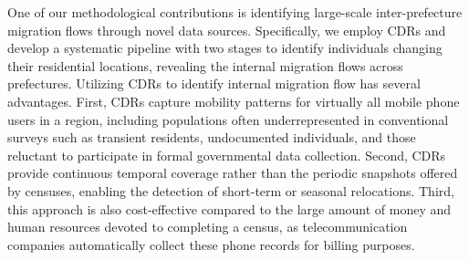 One of our methodological contributions is identifying large-scale inter-prefecture migration flows through novel data sources.
Specifically, we employ CDRs and develop a systematic pipeline with two stages to identify individuals changing their residential locations, revealing the internal migration flows across prefectures.
Utilizing CDRs to identify internal migration flow has several advantages. First, CDRs capture mobility patterns for virtually all mobile phone users in a region, including populations often underrepresented in conventional surveys such as transient residents, undocumented individuals, and those reluctant to participate in formal governmental data collection. Second, CDRs provide continuous temporal coverage rather than the periodic snapshots offered by censuses, enabling the detection of short-term or seasonal relocations. Third, this approach is also cost-effective compared to the large amount of money and human resources devoted to completing a census, as telecommunication companies automatically collect these phone records for billing purposes.




